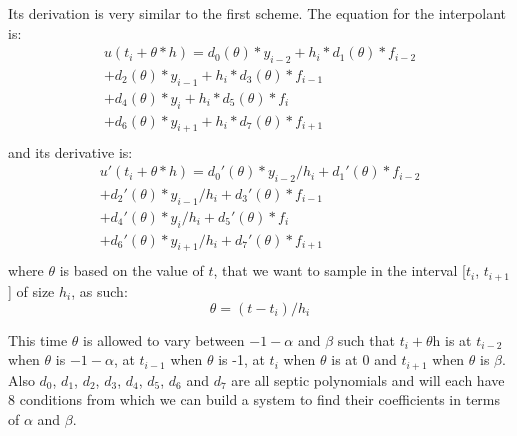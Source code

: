 \documentclass{article}
\begin{document}
Its derivation is very similar to the first scheme. The equation for the interpolant is:
\begin{equation}
\begin{split}
u(t_i + \theta*h) = d_{0}(\theta)*y_{i-2} +  h_i*d_{1}(\theta)*f_{i-2} \\
+ d_{2}(\theta)*y_{i-1}     +  h_i*d_{3}(\theta)*f_{i-1} \\
+ d_{4}(\theta)*y_i     +  h_i*d_{5}(\theta)*f_i \\
+ d_{6}(\theta)*y_{i + 1} + h_i*d_{7}(\theta)*f_{i + 1} \\
\end{split}
\end{equation}
and its derivative is:
\begin{equation}
\begin{split}
u'(t_i + \theta*h) = d_{0}'(\theta)*y_{i-2}/h_i +  d_{1}'(\theta)*f_{i-2} \\
+ d_{2}'(\theta)*y_{i-1}/h_i   +  d_{3}'(\theta)*f_{i-1} \\
+ d_{4}'(\theta)*y_i/h_i       +  d_{5}'(\theta)*f_i \\
+ d_{6}'(\theta)*y_{i + 1}/h_i +  d_{7}'(\theta)*f_{i + 1} \\
\end{split}
\end{equation}
where $\theta$ is based on the value of $t$, that we want to sample in the interval [$t_i$, $t_{i + 1}$] of size $h_i$, as such:
\begin{equation}
\theta = (t - t_i) / h_i
\end{equation}

This time $\theta$ is allowed to vary between $-1-\alpha$ and $\beta$ such that $t_i + \theta$h is at $t_{i-2}$ when $\theta$ is $-1-\alpha$, at $t_{i-1}$ when $\theta$ is -1, at $t_i$ when $\theta$ is at 0 and $t_{i + 1}$ when $\theta$ is $\beta$. Also $d_0$, $d_1$, $d_2$, $d_3$, $d_4$, $d_5$, $d_6$ and $d_7$ are all septic polynomials and will each have 8 conditions from which we can build a system to find their coefficients in terms of $\alpha$ and $\beta$.
\end{document}
